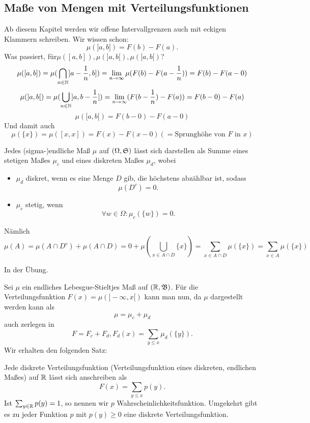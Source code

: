 		\subsection{Maße von Mengen mit Verteilungsfunktionen}
			Ab diesem Kapitel werden wir offene Intervallgrenzen auch mit eckigen Klammern schreiben.\newline
			Wir wissen schon:
			\[ \mu(]a,b])=F(b)-F(a). \]
			Was passiert, für$\mu([a,b]), \mu(]a,b[), \mu([a,b[)$? 
			\[ \mu([a,b])=\mu(\bigcap_{n\in\mathbb{N}}]a-\frac{1}{n},b])=\lim_{n\to\infty}\mu(F(b)-F(a-\frac{1}{n}))=F(b)-F(a-0) \]
			\[ \mu(]a,b[)=\mu(\bigcup_{n\in\mathbb{N}}]a,b-\frac{1}{n}])=\lim_{n\to\infty}(F(b-\frac{1}{n})-F(a))=F(b-0)-F(a) \]
			\[ \mu([a,b[)=F(b-0)-F(a-0) \]
			Und damit auch 
			\[ \mu(\{x\})=\mu([x,x])=F(x)-F(x-0) (=\text{Sprunghöhe von $F\text{ in $x$}$}) \]
			\begin{satz}
				Jedes (sigma-)endliche Maß $\mu$ auf $(\Omega, \mathfrak{S})$ lässt sich darstellen als Summe eines stetigen Maßes $\mu_c$ und eines diskreten Maßes $\mu_d$, wobei
				\begin{itemize}
					\item $\mu_d$ diskret, wenn es eine Menge $D$ gib, die höchstens abzählbar ist, sodass
					\[ \mu(D^c)=0. \]
					\item $\mu_c$ stetig, wenn 
					\[ \forall w\in\Omega: \mu_c(\{w\})=0. \]
				\end{itemize}
				Nämlich
				\[ \mu(A)=\mu(A\cap D^c)+\mu(A\cap D)=0+\mu(\bigcup_{x\in A\cap D} \{x\})=\sum_{x\in A\cap D}\mu(\{x\})=\sum_{x\in A}\mu(\{x\}) \]
			\end{satz}
			
			\begin{bew}
				In der Übung.
			\end{bew}
			
			\begin{bsp}
				Sei $\mu$ ein endliches Lebesgue-Stieltjes Maß auf $(\mathbb{R},\mathfrak{B})$. Für die Verteilungsfunktion $F(x)=\mu(]-\infty,x[)$ kann man nun, da $\mu$ dargestellt werden kann als
				\[ \mu=\mu_c+\mu_d \]
				auch zerlegen in 
				\[ F=F_c+F_d, F_d(x)=\sum_{y\le x} \mu_d(\{y\}).\]
				Wir erhalten den folgenden Satz:
			\end{bsp}
			
			\begin{satz}
				Jede diskrete Verteilungsfunktion (Verteilungsfunktion eines diskreten, endlichen Maßes) auf $\mathbb{R}$ lässt sich anschreiben als
				\[ F(x)=\sum_{y\le x} p(y). \]
				Ist $\sum_{y\in\mathbb{R}} p(y)=1$, so nennen wir $p$ Wahrscheinlichkeitsfunktion. Umgekehrt gibt es zu jeder Funktion $p$ mit $p(y)\ge 0$ eine diskrete Verteilungsfunktion. 
			\end{satz}
			
